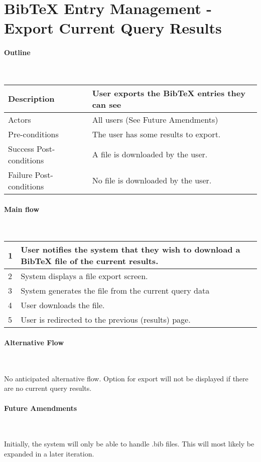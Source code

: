 \section*{BibTeX Entry Management - Export Current Query Results}

\paragraph*{Outline} \

\begin{tabular}{ | l | l | }
\hline
Description & User exports the BibTeX entries they can see \\ \hline
Actors & All users (See  Future Amendments) \\ \hline
Pre-conditions & The user has some results to export. \\ \hline
Success Post-conditions & A file is downloaded by the user. \\ \hline
Failure Post-conditions & No file is downloaded by the user. \\ \hline
\end{tabular}


\paragraph*{Main flow} \

\begin{tabular}{ | l | l | } \hline
1 & User notifies the system that they wish to download a BibTeX file of the current results. \\ \hline
2 & System displays a file export screen. \\ \hline
3 & System generates the file from the current query data \\ \hline
4 & User downloads the file. \\ \hline
5 & User is redirected to the previous (results) page. \\ \hline
\end{tabular}


\paragraph*{Alternative Flow} \

No anticipated alternative flow.  Option for export will not be displayed if there are no current query results.

\paragraph*{Future Amendments} \

Initially, the system will only be able to handle .bib files. This will most likely be expanded in a later iteration.

